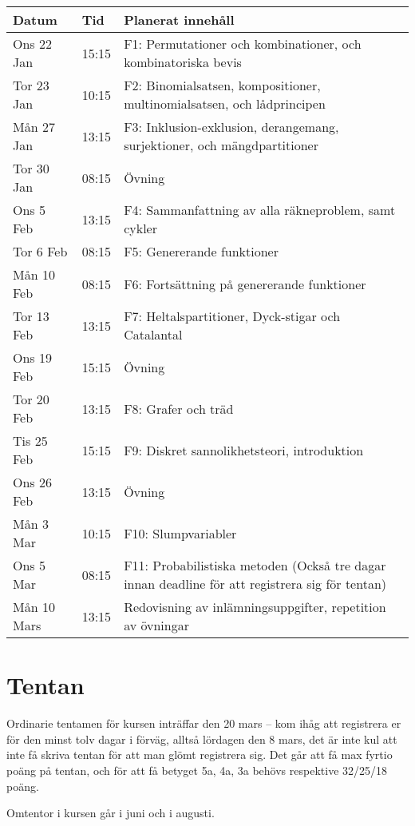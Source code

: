 \documentclass[nobib]{tufte-handout}
\begin{document}
\begin{table}[h]
\begin{tabularx}{\textwidth}{llX}
Datum & Tid      & Planerat innehåll \\ 
\midrule
Ons 22 Jan &15:15 & F1: Permutationer och kombinationer, och kombinatoriska bevis\\
Tor 23 Jan &10:15 & F2: Binomialsatsen, kompositioner, multinomialsatsen, och lådprincipen\\
Mån 27 Jan &13:15 & F3: Inklusion-exklusion, derangemang, surjektioner, och mängdpartitioner\\
Tor 30 Jan &08:15 & Övning\\
Ons 5 Feb &13:15 & F4: Sammanfattning av alla räkneproblem, samt cykler\\
Tor 6 Feb &08:15 & F5: Genererande funktioner\\
Mån 10 Feb &08:15 & F6: Fortsättning på genererande funktioner\\
Tor 13 Feb &13:15 & F7: Heltalspartitioner, Dyck-stigar och Catalantal\\
Ons 19 Feb &15:15 & Övning\\
Tor 20 Feb &13:15 & F8: Grafer och träd\\
Tis 25 Feb &15:15 & F9: Diskret sannolikhetsteori, introduktion\\
Ons 26 Feb &13:15 & Övning\\
Mån 3 Mar &10:15 & F10: Slumpvariabler\\
Ons 5 Mar &08:15 & F11: Probabilistiska metoden (Också tre dagar innan deadline för att registrera sig för tentan)\\
Mån 10 Mars &13:15 & Redovisning av inlämningsuppgifter, repetition av övningar
\end{tabularx}
\end{table}

\section{Tentan}

Ordinarie tentamen för kursen inträffar den 20 mars -- kom ihåg att registrera er för den minst tolv dagar i förväg, alltså lördagen den 8 mars, det är inte kul att inte få skriva tentan för att man glömt registrera sig. Det går att få max fyrtio poäng på tentan, och för att få betyget 5a, 4a, 3a behövs respektive 32/25/18 poäng.

Omtentor i kursen går i juni och i augusti.
\end{document}
